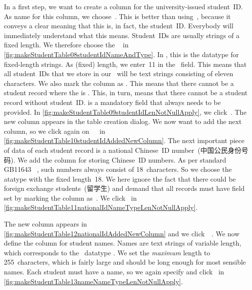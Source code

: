 In a first step, we want to create a column for the university-issued student~ID.
As name for this column, we choose~.
This is better than using~, because it conveys a clear meaning that this is, in fact, the student~ID.
Everybody will immediately understand what this means.
Student~IDs are usually strings of a fixed length.
We therefore choose the ~ in \cref{fig:makeStudentTable08studentIdNameAndType}.
In \sql, this is the datatype for fixed-length strings.
As (fixed) length, we enter~11 in the ~field.
This means that all student~IDs that we store in our \db\ will be text strings consisting of eleven characters.
We also mark the column as .
This means that there cannot be a student record where the  is .
This, in turn, means that there cannot be a student record without student~ID.
 is a mandatory field that always needs to be provided.
In \cref{fig:makeStudentTable09studentIdLenNotNullApply}, we click~.%
%
%
%
The new column appears in the table creation dialog.
We now want to add the next column, so we click again on~~\pgmodelerAddItem\ in \cref{fig:makeStudentTable10studentIdAddedNewColumn}.
The next important piece of data of each student record is a national Chinese~ID number~(中国公民身份号码).
We add the column  for storing Chinese~ID numbers.
As per standard \mbox{GB11643} ~\cite{GB116431999CIN}, such numbers always consist of 18~characters.
So we choose the atatype  with the fixed length~18.
We here ignore the fact that there could be foreign exchange students~(留学生) and demand that all records must have  field set by marking the column as~.
We click~ in \cref{fig:makeStudentTable11nationalIdNameTypeLenNotNullApply}.

The new column appears in \cref{fig:makeStudentTable12nationalIdAddedNewColumn} and we click~~\pgmodelerAddItem.
We now define the column  for student names.
Names are text strings of variable length, which corresponds to the \sql\ datatype .
We set the \emph{maximum} length to 255~characters, which is fairly large and should be long enough for most sensible names.
Each student must have a name, so we again specify  and click~ in \cref{fig:makeStudentTable13nameNameTypeLenNotNullApply}.


